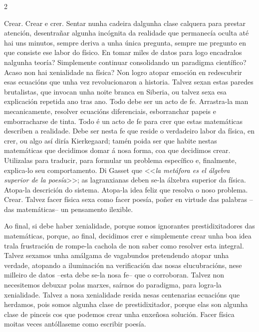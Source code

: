 \begin{multicols}{2}

Crear. Crear e crer. Sentar nunha cadeira dalgunha clase calquera para prestar
atención, desentrañar algunha incógnita da realidade que permanecía oculta até
hai uns minutos, sempre deriva a unha única pregunta, sempre me pregunto en que
consiste ese labor do físico. En tomar miles de datos para logo encadralos
nalgunha teoría? Simplemente continuar consolidando un paradigma científico?
Acaso non hai xenialidade na física? Non logro atopar emoción en redescubrir
esas ecuacións que unha vez revolucionaron a historia. Talvez sexan estas
paredes brutalistas, que invocan unha noite branca en Siberia, ou talvez sexa
esa explicación repetida ano tras ano. Todo debe ser un acto de fe. Arrastra-la
man mecanicamente, resolver ecuacións diferenciais, esborranchar papeis e
emborracharse de tinta. Todo é un acto de fe para crer que estas matemáticas
describen a realidade. Debe ser nesta fe que reside o verdadeiro labor da
física, en crer, ou algo así diría Kierkegaard; tamén poida ser que habite
nestas matemáticas que decidimos domar á nosa forma, coa que decidimos crear.
Utilizalas para traducir, para formular un problema específico e, finalmente,
explica-lo seu comportamento. Di Gasset que <<\textit{la metáfora es el álgebra
superior de la poesía}>>; as lagranxianas deben se-la álxebra superior da
física. Atopa-la descrición do sistema. Atopa-la idea feliz que resolva o noso
problema. Crear. Talvez facer física sexa como facer poesía, poñer en virtude
das palabras --das matemáticas-- un pensamento ilexible.

Ao final, si debe haber xenialidade, porque somos ignorantes prestidixitadores
das matemáticas, porque, ao final, decidimos crer e simplemente crear unha boa
idea trala frustración de rompe-la cachola de non saber como resolver esta
integral. Talvez sexamos unha amálgama de vagabundos pretendendo atopar unha
verdade, atopando a iluminación na verificación das nosas elucubracións, nese
milleiro de datos --esta debe se-la nosa fe-- que o corroboran. Talvez non
necesitemos debuxar polas marxes, saírnos do paradigma, para logra-la
xenialidade. Talvez a nosa xenialidade resida nesas centenarias ecuacións que
herdamos, pois somos algunha clase de prestidixitador, porque elas son algunha
clase de pinceis cos que podemos crear unha enxeñosa solución. Facer física
moitas veces antóllaseme como escribir poesía.

\end{multicols}
